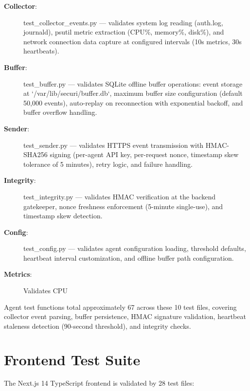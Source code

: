 \begin{description}
    \item[\textbf{Collector}:] test\_collector\_events.py — validates system log reading (auth.log, journald), psutil metric extraction (CPU\%, memory\%, disk\%), and network connection data capture at configured intervals (10s metrics, 30s heartbeats).
    \item[\textbf{Buffer}:] test\_buffer.py — validates SQLite offline buffer operations: event storage at `/var/lib/securi/buffer.db`, maximum buffer size configuration (default 50,000 events), auto-replay on reconnection with exponential backoff, and buffer overflow handling.
    \item[\textbf{Sender}:] test\_sender.py — validates HTTPS event transmission with HMAC-SHA256 signing (per-agent API key, per-request nonce, timestamp skew tolerance of 5 minutes), retry logic, and failure handling.
    \item[\textbf{Integrity}:] test\_integrity.py — validates HMAC verification at the backend gatekeeper, nonce freshness enforcement (5-minute single-use), and timestamp skew detection.
    \item[\textbf{Config}:] test\_config.py — validates agent configuration loading, threshold defaults, heartbeat interval customization, and offline buffer path configuration.
    \item[\textbf{Metrics}:] Validates CPU%
\end{description}

Agent test functions total approximately 67 across these 10 test files, covering collector event parsing, buffer persistence, HMAC signature validation, heartbeat staleness detection (90-second threshold), and integrity checks.

\section{Frontend Test Suite}
The Next.js 14 TypeScript frontend is validated by 28 test files:

